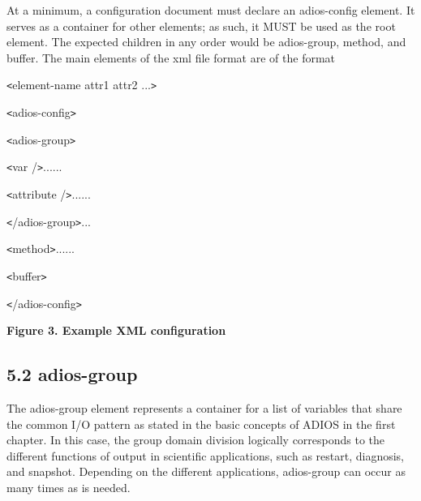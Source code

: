 \vspace{10pt}
At a minimum, a configuration document must declare an adios-config element. It 
serves as a container for other elements; as such, it MUST be used as the root 
element. The expected children in any order would be adios-group, method, and buffer. 
The main elements of the xml file format are of the format 

\vspace{10pt}
\texttt{<}element-name attr1 attr2 ...\texttt{>}


\vspace{22pt}
\leftskip=28pt
\texttt{<}adios-config\texttt{>}

\vspace{10pt}
\leftskip=45pt
\texttt{<}adios-group\texttt{>}

\vspace{10pt}
\leftskip=63pt
\texttt{<}var /\texttt{>}......

\vspace{22pt}
\texttt{<}attribute /\texttt{>}......

\vspace{22pt}
\leftskip=45pt
\texttt{<}/adios-group\texttt{>}...

\vspace{22pt}
\texttt{<}method\texttt{>}......

\vspace{22pt}
\texttt{<}buffer\texttt{>}

\vspace{10pt}
\leftskip=28pt
\texttt{<}/adios-config\texttt{>}

\label{HToc144350162}\label{HRef119578307}

\vspace{22pt}
\leftskip=18pt
{\color{color20} \textbf{Figure 3. Example XML configuration\label{HToc82067519}\label{HToc84890242}\label{HToc212016618}\label{HToc212016860}\label{HToc182553365}}}

\vspace{10pt}
\subsection*{{\large 5.2 }{\large \textbf{adios-group}}}

\vspace{10pt}
\leftskip=0pt
The adios-group element represents a container for a list of variables that share 
the common I/O pattern as stated in the basic concepts of ADIOS in the first chapter. 
In this case, the group domain division logically corresponds to the different 
functions of output in scientific applications, such as restart, diagnosis, and 
snapshot. Depending on the different applications, adios-group can occur as many 
times as is needed. \label{HToc84890243}\label{HToc212016619}\label{HToc212016861}\label{HToc182553366}

